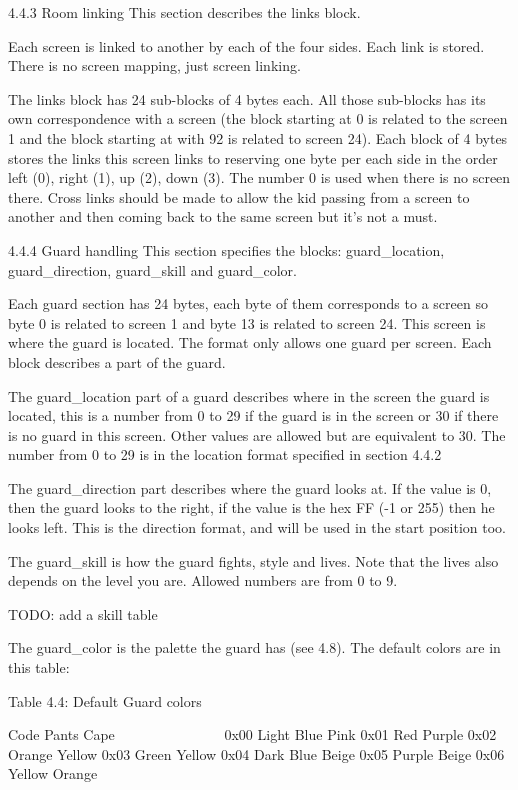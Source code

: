 4.4.3 Room linking
 This section describes the links block.

 Each screen is linked to another by each of the four sides. Each link
 is stored. There is no screen mapping, just screen linking.

 The links block has 24 sub-blocks of 4 bytes each. All those sub-blocks
 has its own correspondence with a screen (the block starting at 0 is
 related to the screen 1 and the block starting at with 92 is related to
 screen 24).
 Each block of 4 bytes stores the links this screen links to reserving one
 byte per each side in the order left (0), right (1), up (2), down (3).
 The number 0 is used when there is no screen there.
 Cross links should be made to allow the kid passing from a screen to
 another and then coming back to the same screen but it's not a must.

4.4.4 Guard handling
 This section specifies the blocks: guard_location, guard_direction,
 guard_skill and guard_color.

 Each guard section has 24 bytes, each byte of them corresponds to a screen
 so byte 0 is related to screen 1 and byte 13 is related to screen 24.
 This screen is where the guard is located. The format only allows one
 guard per screen. Each block describes a part of the guard.

 The guard_location part of a guard describes where in the screen the guard
 is located, this is a number from 0 to 29 if the guard is in the screen or
 30 if there is no guard in this screen. Other values are allowed but are
 equivalent to 30. The number from 0 to 29 is in the location format
 specified in section 4.4.2

 The guard_direction part describes where the guard looks at. If the value
 is 0, then the guard looks to the right, if the value is the hex FF (-1 or
 255) then he looks left. This is the direction format, and will be used in
 the start position too.

 The guard_skill is how the guard fights, style and lives. Note that the
 lives also depends on the level you are. Allowed numbers are from 0 to 9.

 TODO: add a skill table

 The guard_color is the palette the guard has (see 4.8).
 The default colors are in this table:

                   Table 4.4: Default Guard colors
                   ~~~~~~~~~~~~~~~~~~~~~~~~~~~~~~~

  Code Pants     Cape
  ~~~~ ~~~~~     ~~~~
  0x00 Light     Blue Pink
  0x01 Red       Purple
  0x02 Orange    Yellow
  0x03 Green     Yellow
  0x04 Dark Blue Beige
  0x05 Purple    Beige
  0x06 Yellow    Orange

